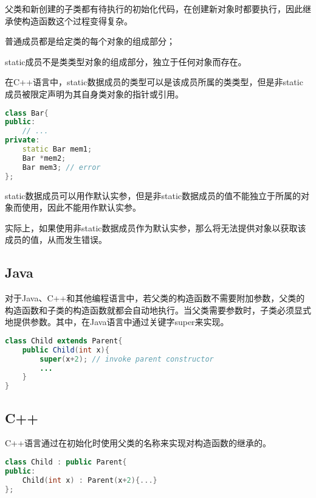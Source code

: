 父类和新创建的子类都有待执行的初始化代码，在创建新对象时都要执行，因此继承使构造函数这个过程变得复杂。

\begin{compactitem}
\item 普通成员都是给定类的每个对象的组成部分；
\item static成员不是类类型对象的组成部分，独立于任何对象而存在。
\end{compactitem}

在C++语言中，static数据成员的类型可以是该成员所属的类类型，但是非static成员被限定声明为其自身类对象的指针或引用。


\begin{lstlisting}[language=C++]
class Bar{
public:
	// ...
private:
	static Bar mem1;
	Bar *mem2;
	Bar mem3; // error
};
\end{lstlisting}

static数据成员可以用作默认实参，但是非static数据成员的值不能独立于所属的对象而使用，因此不能用作默认实参。

实际上，如果使用非static数据成员作为默认实参，那么将无法提供对象以获取该成员的值，从而发生错误。



\subsection{Java}


对于Java、C++和其他编程语言中，若父类的构造函数不需要附加参数，父类的构造函数和子类的构造函数就都会自动地执行。当父类需要参数时，子类必须显式地提供参数。其中，在Java语言中通过关键字super来实现。




\begin{lstlisting}[language=Java]
class Child extends Parent{
	public Child(int x){
		super(x+2); // invoke parent constructor
		...
	}
}
\end{lstlisting}


\subsection{C++}

C++语言通过在初始化时使用父类的名称来实现对构造函数的继承的。



\begin{lstlisting}[language=C++]
class Child : public Parent{
public:
	Child(int x) : Parent(x+2){...}
};
\end{lstlisting}



